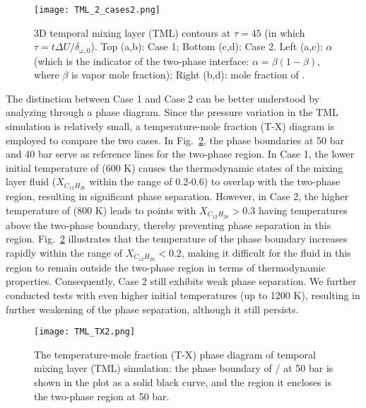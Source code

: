 \begin{figure}[htbp]
\centering
\texttt{[image: TML\_2\_cases2.png]}

\caption{3D temporal mixing layer (TML) contours at $\tau = 45$ (in which $\tau = t \Delta U/ \delta_{\omega,0}$). Top (a,b): Case 1; Bottom (c,d): Case 2. Left (a,c): $\alpha$ (which is the indicator of the two-phase interface: $\alpha = \beta(1-\beta)$, where $\beta$ is vapor mole fraction); Right (b,d): mole fraction of .}
\label{TML_3D_result} 
\end{figure}
The distinction between Case 1 and Case 2 can be better understood by analyzing through a phase diagram. Since the pressure variation in the TML simulation is relatively small, a temperature-mole fraction (T-X) diagram is employed to compare the two cases. In Fig.~\ref{TML_TX}, the phase boundaries at 50 bar and 40 bar serve as reference lines for the two-phase region. In Case 1, the lower initial temperature of  (600 K) causes the thermodynamic states of the mixing layer fluid ($X_{C_{12}H_{26}}$ within the range of 0.2-0.6) to overlap with the two-phase region, resulting in significant phase separation. However, in Case 2, the higher temperature of  (800 K) leads to points with $X_{C_{12}H_{26}}>0.3$ having temperatures above the two-phase boundary, thereby preventing phase separation in this region. Fig.~\ref{TML_TX} illustrates that the temperature of the phase boundary increases rapidly within the range of $X_{C_{12}H_{26}}<0.2$, making it difficult for the fluid in this region to remain outside the two-phase region in terms of thermodynamic properties. Consequently, Case 2 still exhibits weak phase separation. We further conducted tests with even higher initial  temperatures (up to 1200 K), resulting in further weakening of the phase separation, although it still persists.

\begin{figure}[htbp]
\centering
\texttt{[image: TML\_TX2.png]}
\caption{The temperature-mole fraction (T-X) phase diagram of temporal mixing layer (TML) simulation: the phase boundary of / at 50 bar is shown in the plot as a solid black curve, and the region it encloses is the two-phase region at 50 bar.}
\label{TML_TX} 
\end{figure}

